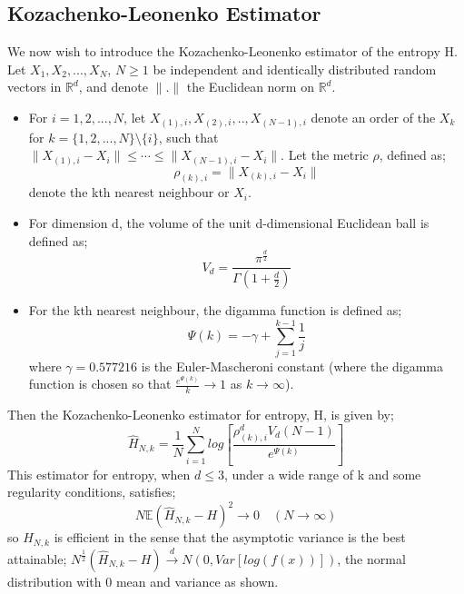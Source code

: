 \documentclass{article}
\begin{document}
\subsection{Kozachenko-Leonenko Estimator}

We now wish to introduce the Kozachenko-Leonenko estimator of the entropy H. Let $X_{1}, X_{2}, ... ,X_{N}$, $N \geq 1$ be independent and identically distributed random vectors in $\mathbb{R}^{d}$, and denote $\|.\|$ the Euclidean norm on $\mathbb{R}^{d}$.
 
\begin{itemize}

\item For $i = 1, 2, ..., N$, let $X_{(1), i}, X_{(2), i}, .., X_{(N-1), i}$ denote an order of the $X_{k}$ for $k = \{1, 2, ..., N\} \setminus \{i\}$, such that $\| X_{(1), i} - X_{i}\| \leq \cdots \leq \|  X_{(N-1), i} - X_{i}\| $. Let the metric $\rho$, defined as;
\begin{equation}
\rho_{(k), i} = \| X_{(k), i} - X_{i}\|
\end{equation} denote the kth nearest neighbour or $X_{i}$.

\item  For dimension d, the volume of the unit d-dimensional Euclidean ball is defined as;
\begin{equation}
V_{d} = \frac{\pi^\frac{d}{2}}{\Gamma(1 + \frac{d}{2})}
\end{equation}

\item For the kth nearest neighbour, the digamma function is defined as;
\begin{equation}
\Psi(k) = -\gamma + \sum_{j=1}^{k-1} \frac{1}{j}
\end{equation}
where $\gamma = 0.577216$ is the Euler-Mascheroni constant (where the digamma function is chosen so that $\frac{e^{\Psi(k)}}{k}\to1$ as $k \to \infty$).

\end{itemize} Then the Kozachenko-Leonenko estimator for entropy, H, is given by;
\begin{equation} \label{KLest}
\hat{H}_{N, k} = \frac{1}{N} \sum_{i=1}^{N} log \left[ \frac{\rho_{(k),i}^{d} V_{d} (N-1)}{e^{\Psi(k)}} \right]
\end{equation} This estimator for entropy, when $d \leq 3$, under a wide range of k and some regularity conditions, satisfies;
\begin{equation} \label{efficiency}
N \mathbb{E} {(\hat{H}_{N, k} - H)^2} \to 0 \quad  (N \to \infty)
\end{equation} so $\hat{H}_{N, k}$ is efficient in the sense that the asymptotic variance is the best attainable; $N^{\frac{1}{2}}(\hat{H}_{N, k} - H) \xrightarrow{d} N(0, Var[log(f(x))])$, the normal distribution with 0 mean and variance as shown.
\end{document}
